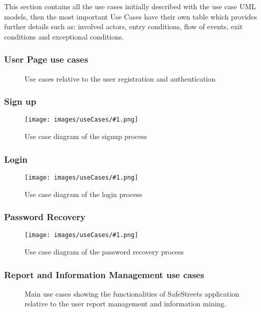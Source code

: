 \newcommand{\usecasefigure}[2]{
	\begin{figure}[htp]
		\centering
		\texttt{[image: images/useCases/\#1.png]}
		\caption{Use case diagram #2}
		\label{fig:use_cases_#1}
	\end{figure}
	\newpage
}

This section contains all the use cases initially described with the use case UML models, then the most important Use Cases have their own table which provides further details such as: involved actors, entry conditions, flow of events,  exit conditions and exceptional conditions.

\subsubsection{User Page use cases}
\begin{figure}[htp] 
\caption{Use cases relative to the user registration and authentication} 
\label{fig:userpage} 
\end{figure} 

\newpage
\subsubsection{Sign up}

\newpage
\usecasefigure{sign_up}{of the signup process}
\subsubsection{Login}

\newpage
\usecasefigure{login}{of the login process}
\subsubsection{Password Recovery}

\usecasefigure{password_recovery}{of the password recovery process}

\subsubsection{Report and Information Management use cases}
\begin{figure}[htp] 
	\caption{Main use cases showing the functionalities of SafeStreets application relative to the user report management and information mining.} 
	\label{fig:reportmanagement} 
\end{figure}

